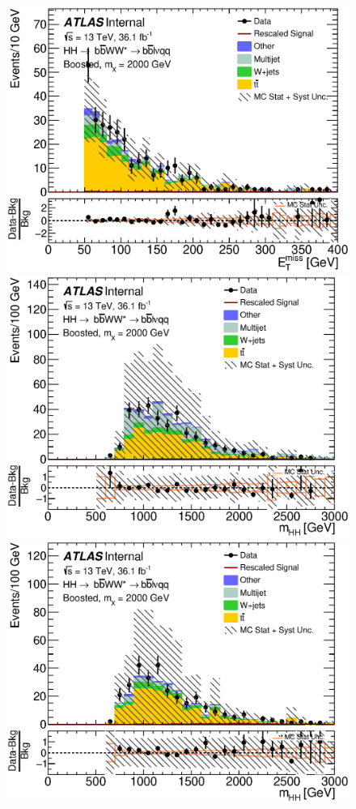 \begin{figure}[H]
\begin{center}
\includegraphics[scale=0.33]{figures/kinplots/C_2tag_mbbcr_muon_presel_met50_MET}\\
\includegraphics[scale=0.33]{figures/kinplots/C_2tag_mbbcr_elec_presel_met50_hhMassRebin1}
\includegraphics[scale=0.33]{figures/kinplots/C_2tag_mbbcr_muon_presel_met50_hhMassRebin1}

\end{center}
\end{figure}
